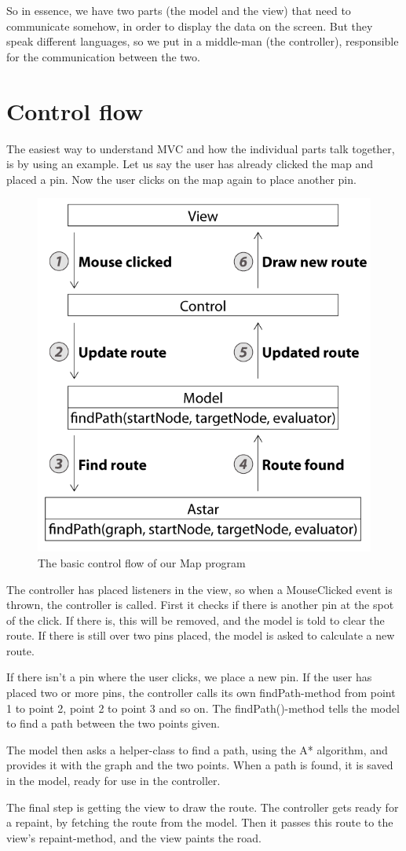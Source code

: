 So in essence, we have two parts (the model and the view) that need to communicate 
somehow, in order to display the data on the screen. But they speak different languages, so 
we put in a middle-man (the controller), responsible for the communication between the two.

\section{Control flow}
\label{UML-CF}
The easiest way to understand MVC and how the individual parts talk together, is by using 
an example. Let us say the user has already clicked the map and placed a pin. Now the 
user clicks on the map again to place another pin.

\begin{figure}[h!]
\centering
\includegraphics[width=0.7\linewidth]{images/SimpleControlFlow}
\caption{The basic control flow of our Map program}
\label{control-flow}
\end{figure}

The controller has placed listeners in the view, so when a MouseClicked event is
thrown, the controller is called. First it checks if there is another pin at the spot of the click. If there 
is, this will be removed, and the model is told to clear the route. If there is still over two 
pins placed, the model is asked to calculate a new route.

If there isn't a pin where the user clicks, we place a new pin. If the user has placed two or 
more pins, the controller calls its own findPath-method from point 1 to point 2, point 2 to 
point 3 and so on. The findPath()-method tells the model to find a path between the two 
points given.

The model then asks a helper-class to find a path, using the A* algorithm, and provides it 
with the graph and the two points. When a path is found, it is saved in the model, ready 
for use in the controller.

The final step is getting the view to draw the route. The controller gets ready for a repaint, 
by fetching the route from the model. Then it passes this route to the view's repaint-method, 
and the view paints the road.